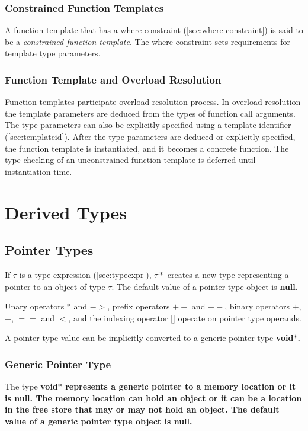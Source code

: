 \documentclass[a4paper,oneside,11pt]{article}
\begin{document}
\subsubsection{Constrained Function Templates}

A function template that has a where-constraint (\ref{sec:where-constraint}) is said to be a
\emph{constrained function template}.
The where-constraint sets requirements for template type parameters.

\subsubsection{Function Template and Overload Resolution}

Function templates participate overload resolution process.
In overload resolution the template parameters are deduced from the types of function call arguments.
The type parameters can also be explicitly specified using a template identifier (\ref{sec:templateid}).
After the type parameters are deduced or explicitly specified, the function template is instantiated,
and it becomes a concrete function.
The type-checking of an unconstrained function template is deferred until instantiation time.

\section{Derived Types}

\subsection{Pointer Types}\label{sec:pointertypes}

If $\tau$ is a type expression (\ref{sec:typeexpr}), $\tau*$ creates a new type representing a pointer to an object of type $\tau$.
The default value of a pointer type object is \bf{null}.

Unary operators $*$ and $->$, prefix operators $++$ and $--$, binary operators $+$, $-$, $==$ and $<$,
and the indexing operator [] operate on pointer type operands.

A pointer type value can be implicitly converted to a generic pointer type \bf{void$*$}.

\subsubsection{Generic Pointer Type}

The type \bf{void$*$} represents a generic pointer to a memory location or it is \bf{null}.
The memory location can hold an object or it can be a location in the free store that
may or may not hold an object.
The default value of a generic pointer type object is \bf{null}.
\end{document}

